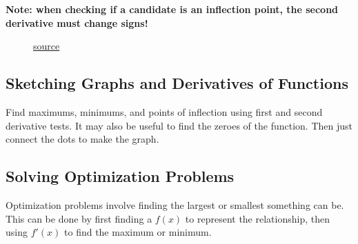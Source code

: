\documentclass[12pt]{article}
\begin{document}
                \noindent \textbf{Note: when checking if a candidate is an inflection point, the second derivative must change signs!}

                \begin{figure}[H]
                    \begin{center}
                        \caption{\href{https://www.khanacademy.org/math/ap-calculus-ab/ab-diff-analytical-applications-new/ab-5-6b/a/review-analyzing-the-second-derivative-to-find-inflection-points}{source}}
                        \label{fig:concavityinflection}
                    \end{center}
                \end{figure}

        \subsection{Sketching Graphs and Derivatives of Functions} %
            Find maximums, minimums, and points of inflection using first and second derivative tests. It may also be useful to find the zeroes of the function. Then just connect the dots to make the graph.

        \subsection{Solving Optimization Problems}
            Optimization problems involve finding the largest or smallest something can be. This can be done by first finding a $f(x)$ to represent the relationship, then using $f'(x)$ to find the maximum or minimum.
\end{document}
